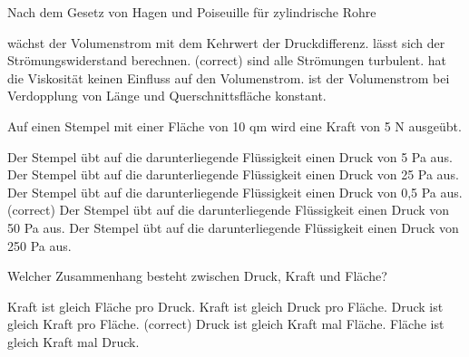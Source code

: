 \documentclass[11pt]{exam}
\begin{document}
\setlength{\voffset}{-0.5in}
\setlength{\headsep}{5pt}

\hspace{2mm}
 \hspace{5mm}
\vspace{4mm}

\begin{questions}

\question Nach dem Gesetz von Hagen und Poiseuille für zylindrische Rohre

\begin{choices}
	\choice wächst der Volumenstrom mit dem Kehrwert der Druckdifferenz.
	\choice lässt sich der Strömungswiderstand berechnen. (correct)
	\choice sind alle Strömungen turbulent.
	\choice hat die Viskosität keinen Einfluss auf den Volumenstrom.
	\choice ist der Volumenstrom bei Verdopplung von Länge und Querschnittsfläche konstant.
\end{choices}

\vspace{3mm}\question Auf einen Stempel mit einer Fläche von 10 qm wird eine Kraft von 5 N ausgeübt.

\begin{choices}
	\choice Der Stempel übt auf die darunterliegende Flüssigkeit einen Druck von 5 Pa aus.
	\choice Der Stempel übt auf die darunterliegende Flüssigkeit einen Druck von 25 Pa aus.
	\choice Der Stempel übt auf die darunterliegende Flüssigkeit einen Druck von 0,5 Pa aus. (correct)
	\choice Der Stempel übt auf die darunterliegende Flüssigkeit einen Druck von 50 Pa aus.
	\choice Der Stempel übt auf die darunterliegende Flüssigkeit einen Druck von 250 Pa aus.
\end{choices}

\vspace{3mm}\question Welcher Zusammenhang besteht zwischen Druck, Kraft und Fläche?

\begin{choices}
	\choice Kraft ist gleich Fläche pro Druck.
	\choice Kraft ist gleich Druck pro Fläche.
	\choice Druck ist gleich Kraft pro Fläche. (correct)
	\choice Druck ist gleich Kraft mal Fläche.
	\choice Fläche ist gleich Kraft mal Druck.
\end{choices}


\end{questions}
\end{document}

